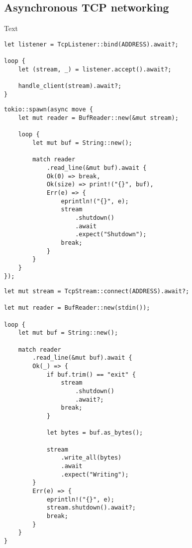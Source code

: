 \subsection{Asynchronous TCP networking}
Text

\begin{verbatim}
let listener = TcpListener::bind(ADDRESS).await?;

loop {
    let (stream, _) = listener.accept().await?;

    handle_client(stream).await?;
}
\end{verbatim}

\begin{verbatim}
tokio::spawn(async move {
    let mut reader = BufReader::new(&mut stream);

    loop {
        let mut buf = String::new();

        match reader
            .read_line(&mut buf).await {
            Ok(0) => break,
            Ok(size) => print!("{}", buf),
            Err(e) => {
                eprintln!("{}", e);
                stream
                    .shutdown()
                    .await
                    .expect("Shutdown");
                break;
            }
        }
    }
});
\end{verbatim}

\begin{verbatim}
let mut stream = TcpStream::connect(ADDRESS).await?;

let mut reader = BufReader::new(stdin());

loop {
    let mut buf = String::new();

    match reader
        .read_line(&mut buf).await {
        Ok(_) => {
            if buf.trim() == "exit" {
                stream
                    .shutdown()
                    .await?;
                break;
            }

            let bytes = buf.as_bytes();

            stream
                .write_all(bytes)
                .await
                .expect("Writing");
        }
        Err(e) => {
            eprintln!("{}", e);
            stream.shutdown().await?;
            break;
        }
    }
}
\end{verbatim}

